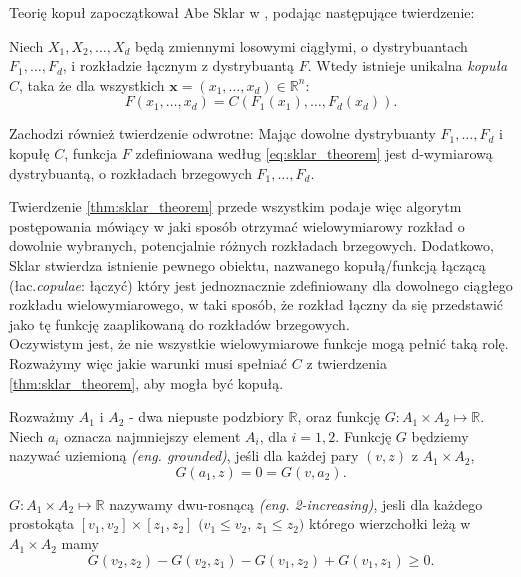Teorię kopuł zapoczątkował Abe Sklar w \cite{Sklar_Theorem}, podając następujące twierdzenie:

\begin{thm}
	Niech $X_1, X_2, \dots, X_d$ będą zmiennymi losowymi ciągłymi, o dystrybuantach $F_1, \dots, F_d$, i rozkładzie łącznym z dystrybuantą $F$. Wtedy istnieje unikalna \emph{kopuła} $C$, taka że dla wszystkich $\mathbf{x} = (x_1, \dots, x_d) \in \mathbb{R}^n$:
	\begin{equation}
		F(x_1, \dots, x_d) = C(F_1(x_1), \dots, F_d(x_d)).
		\label{eq:sklar_theorem}
	\end{equation}
	
	Zachodzi również twierdzenie odwrotne: Mając dowolne dystrybuanty $F_1, \dots, F_d$ i kopułę $C$, funkcja $F$ zdefiniowana według \ref{eq:sklar_theorem} jest d-wymiarową dystrybuantą, o rozkładach brzegowych $F_1, \dots, F_d$. 
	\label{thm:sklar_theorem}
\end{thm}

Twierdzenie \ref{thm:sklar_theorem} przede wszystkim podaje więc algorytm postępowania mówiący w jaki sposób otrzymać wielowymiarowy rozkład o dowolnie wybranych, potencjalnie różnych rozkładach brzegowych. Dodatkowo, Sklar stwierdza istnienie pewnego obiektu, nazwanego kopułą/funkcją łączącą (łac.\emph{copulae}: łączyć) który jest jednoznacznie zdefiniowany dla dowolnego ciągłego rozkładu wielowymiarowego, w taki sposób, że rozkład łączny da się przedstawić jako tę funkcję zaaplikowaną do rozkładów brzegowych.\\

Oczywistym jest, że nie wszystkie wielowymiarowe funkcje mogą pełnić taką rolę. Rozważymy więc jakie warunki musi spełniać $C$ z twierdzenia \ref{thm:sklar_theorem}, aby mogła być kopułą.
\begin{df}
	Rozważmy $A_1$ i $A_2$ - dwa niepuste podzbiory $\mathbb{R}$, oraz funkcję $G\colon A_1\times A_2\mapsto\mathbb{R}$. Niech $a_i$ oznacza najmniejszy element $A_i$, dla $i=1, 2$. Funkcję $G$ będziemy nazywać uziemioną \emph{(eng. grounded)}, jeśli dla każdej pary $(v, z)$ z $A_1\times A_2$,
	\begin{equation}
		G(a_1, z) = 0 = G(v, a_2).
	\end{equation}
	\label{def:grounded_function}
\end{df}

\begin{df}
	$G\colon A_1\times A_2\mapsto \mathbb{R}$ nazywamy dwu-rosnącą \emph{(eng. 2-increasing)}, jesli dla każdego prostokąta $[v_1, v_2]\times [z_1, z_2]$ $(v_1 \leqslant v_2$, $z_1\leqslant z_2)$ którego wierzchołki leżą w $A_1 \times A_2$ mamy
	\begin{equation}
		G(v_2, z_2) - G(v_2, z_1) - G(v_1, z_2) + G(v_1, z_1) \geqslant 0.
	\end{equation}
	\label{def:two_increasing_function}
\end{df}

